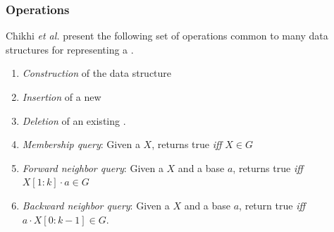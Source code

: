 
\subsubsection{Operations}
\label{subsubsec:dbg-operations}

Chikhi \emph{et al.} \cite{Chikhi2019} present the following set of operations common to many data structures for representing a \dBG.

\begin{enumerate}
  \item \emph{Construction} of the data structure
  \item \emph{Insertion} of a new \kmer
  \item \emph{Deletion} of an existing \kmer.
  \item \emph{Membership query}: Given a \kmer $X$, returns true \emph{iff} $X \in G$
  \item \emph{Forward neighbor query}: Given a \kmer $X$ and a base $a$, returns true \emph{iff} $X[1:k] \cdot a \in G$
  \item \emph{Backward neighbor query}: Given a \kmer $X$ and a base $a$, return true \emph{iff} $a \cdot X[0:k-1] \in G$.
\end{enumerate}

